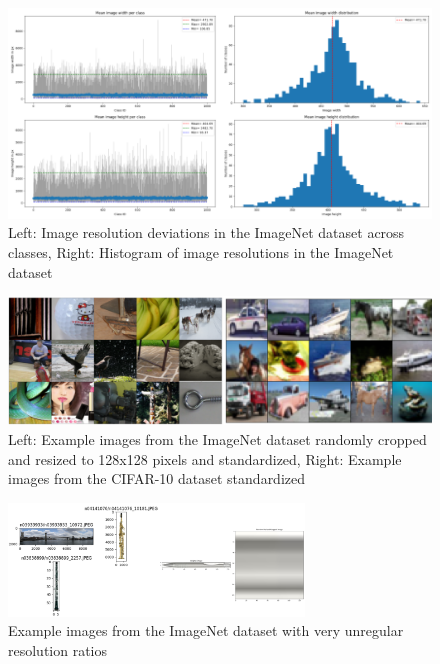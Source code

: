 \begin{figure}[H]
    \centering
    \includegraphics[width=\textwidth]{images/imagenet_histo_errorbars}
    \caption{Left: Image resolution deviations in the ImageNet dataset across classes,
        Right: Histogram of image resolutions in the ImageNet dataset}
    \label{fig:bigboy}
\end{figure}

\begin{figure}[H]
    \centering
    \includegraphics[width=\textwidth]{images/normalized_images_cifar_imagenet}
    \caption{Left: Example images from the ImageNet dataset randomly cropped and resized to 128x128 pixels and standardized, Right: Example images from the CIFAR-10 dataset standardized}
    \label{fig:cifar10_example_normalized}
\end{figure}

\begin{figure}[H]
    \centering
    \includegraphics[width=0.7\textwidth]{images/extreme_shapes}
    \caption{Example images from the ImageNet dataset with very unregular resolution ratios}
    \label{fig:optimum_resolution}
\end{figure}